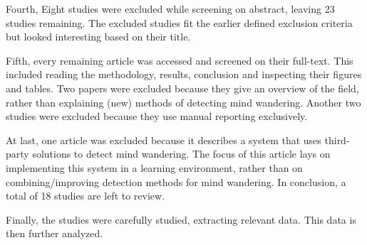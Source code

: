 Fourth, Eight studies were excluded while screening on abstract, leaving 23 studies remaining. 
The excluded studies fit the earlier defined exclusion criteria but looked interesting based on their title.

Fifth, every remaining article was accessed and screened on their full-text. This included reading the methodology, results, conclusion and inspecting their figures and tables.
Two papers were excluded because they give an overview of the field, rather than explaining (new) methods of detecting mind wandering. 
Another two studies were excluded because they use manual reporting exclusively.

At last, one article was excluded because it describes a system that uses third-party solutions to detect mind wandering. The focus of this article lays on implementing this system in a learning environment, rather than on combining/improving detection methods for mind wandering.
In conclusion, a total of 18 studies are left to review.

Finally, the studies were carefully studied, extracting relevant data. This data is then further analyzed.
